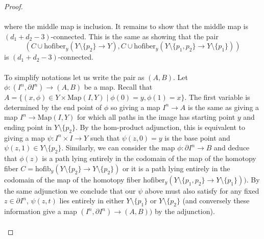 \documentclass[a4paper]{article}
\begin{document}
\begin{prp}{}{}
\begin{proof}
{}\\~\\
where the middle map is inclusion. It remains to show that the middle map is $(d_1+d_2-3)$-connected. This is the same as showing that the pair $$(C\cup \text{hofiber}_y(Y\setminus\{p_2\}\to Y),C\cup\text{hofiber}_y(Y\setminus\{p_1,p_2\}\to Y\setminus\{p_1\}))$$ is $(d_1+d_2-3)$-connected. \\~\\

To simplify notations let us write the pair as $(A,B)$. Let $\phi:(I^n,\partial I^n)\to(A,B)$ be a map. Recall that $A=\{(x,\phi)\in Y\times\text{Map}(I,Y)\;|\;\phi(0)=y,\phi(1)=x\}$. The first variable is determined by the end point of $\phi$ so giving a map $I^n\to A$ is the same as giving a map $I^n\to\text{Map}(I,Y)$ for which all paths in the image has starting point $y$ and ending point in $Y\setminus\{p_2\}$. By the hom-product adjunction, this is equivalent to giving a map $\psi:I^n\times I\to Y$ such that $\psi(z,0)=y$ is the base point and $\psi(z,1)\in Y\setminus\{p_2\}$. Similarly, we can consider the map $\phi:\partial I^n\to B$ and deduce that $\phi(z)$ is a path lying entirely in the codomain of the map of the homotopy fiber $C=\text{hofib}_y(Y\setminus\{p_2\}\to Y\setminus\{p_2\})$ or it is a path lying entirely in the codomain of the map of the homotopy fiber $\text{hofiber}_y(Y\setminus\{p_1,p_2\}\to Y\setminus\{p_1\}))$. By the same adjunction we conclude that our $\psi$ above must also satisfy for any fixed $z\in\partial I^n$, $\psi(z,t)$ lies entirely in either $Y\setminus\{p_1\}$ or $Y\setminus\{p_2\}$ (and conversely these information give a map $(I^n,\partial I^n)\to(A,B))$ by the adjunction). \\~\\


\end{proof}
\end{prp}
\end{document}
